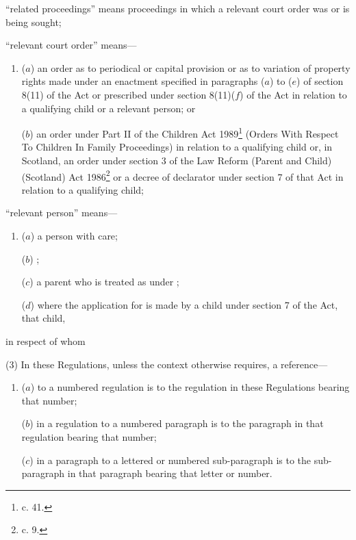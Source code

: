 \documentclass[a4paper,12pt]{article}
\begin{document}
\begin{enumerate}
“related proceedings” means proceedings in which a relevant court order was or is being sought;

“relevant court order” means—
\begin{enumerate}\item[]
($a$) an order as to periodical or capital provision or as to variation of property rights made under an enactment specified in paragraphs ($a$) to ($e$) of section 8(11) of the Act or prescribed under section 8(11)($f$) of the Act in relation to a qualifying child or a relevant person; or

($b$) an order under Part II of the Children Act 1989\footnote{ c. 41.} (Orders With Respect To Children In Family Proceedings) in relation to a qualifying child or, in Scotland, an order under section 3 of the Law Reform (Parent and Child) (Scotland) Act 1986\footnote{ c. 9.} or a decree of declarator under section 7 of that Act in relation to a qualifying child;
\end{enumerate}

“relevant person” means—
\begin{enumerate}\item[]
($a$) a person with care;

($b$) ;

($c$) a parent who is treated as  under 
;  %

($d$) where the application for  is made by a child under section 7 of the Act, that child,
\end{enumerate}
in respect of whom   %
\end{enumerate}

(3) In these Regulations, unless the context otherwise requires, a reference—
\begin{enumerate}\item[]
($a$) to a numbered regulation is to the regulation in these Regulations bearing that number;

($b$) in a regulation to a numbered paragraph is to the paragraph in that regulation bearing that number;

($c$) in a paragraph to a lettered or numbered sub-paragraph is to the sub-paragraph in that paragraph bearing that letter or number.
\end{enumerate}
\end{document}
